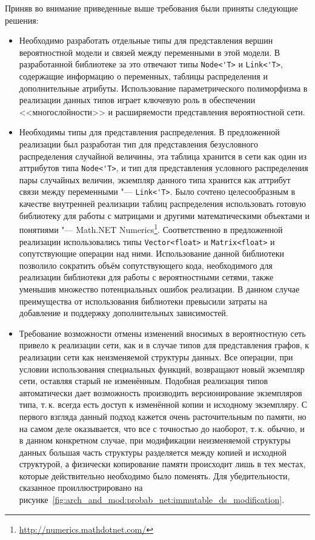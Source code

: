 Приняв во внимание приведенные выше требования были приняты следующие решения:
\begin{itemize}
  \item Необходимо разработать отдельные типы для представления вершин вероятностной модели и связей между переменными в этой модели.
  В разработанной библиотеке за это отвечают типы \lstinline!Node<'T>! и \lstinline!Link<'T>!, содержащие информацию о переменных, таблицы распределения и дополнительные атрибуты.
  Использование параметрического полиморфизма в реализации данных типов играет ключевую роль в обеспечении <<многослойности>> и расширяемости представления вероятностной сети.
  \item Необходимы типы для представления распределения.
  В предложенной реализации был разработан тип для представления безусловного распределения случайной величины, эта таблица хранится в сети как один из аттрибутов типа \lstinline!Node<'T>!, и тип для представления условного распределения пары случайных величин, экземпляр данного типа хранится как аттрибут связи между переменными "--- \lstinline!Link<'T>!.
  Было сочтено целесообразным в качестве внутренней реализации таблиц распределения использовать готовую библиотеку для работы с матрицами и другими математическими объектами и понятиями "--- Math.NET Numerics\footnote{\url{http://numerics.mathdotnet.com/}}.
  Соответственно в предложенной реализации использовались типы \lstinline!Vector<float>! и \lstinline!Matrix<float>! и сопутствующие операции над ними.
  Использование данной библиотеки позволило сократить объём сопутствующего кода, необходимого для реализации библиотеки для работы с вероятностными сетями, также уменьшив множество потенциальных ошибок реализации.
  В данном случае преимущества от использования библиотеки превысили затраты на добавление и поддержку дополнительных зависимостей.

  \item Требование возможности отмены изменений вносимых в вероятностную сеть привело к реализации сети, как и в случае типов для представления графов, к реализации сети как неизменяемой структуры данных.
  Все операции, при условии использования специальных функций, возвращают новый экземпляр сети, оставляя старый не изменённым.
  Подобная реализация типов автоматически дает возможность производить версионирование экземпляров типа, т.\,к. всегда есть доступ к изменённой копии и исходному экземпляру.
  С первого взгляда данный подход кажется очень расточительным по памяти, но на самом деле оказывается, что все с точностью до наоборот, т.\,к. обычно, и в данном конкретном случае, при модификации неизменяемой структуры данных большая часть структуры разделяется между копией и исходной структурой, а физически копирование памяти происходит лишь в тех местах, которые действительно необходимо было поменять.
  Для убедительности, сказанное проиллюстрировано на рисунке~\ref{fig:arch_and_mod:probab_net:immutable_ds_modification}.


\end{itemize}
